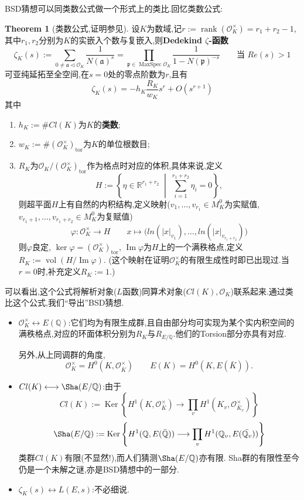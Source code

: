 \documentclass[12pt,A4paper,oneside,reqno]{amsart}
\numberwithin{equation}{section}
\theoremstyle{definition}
\newtheorem{theorem}{Theorem}[section]
\theoremstyle{plain}
\theoremstyle{plain}
\numberwithin{equation}{section}
\theoremstyle{remark}
\DeclareMathOperator{\vol}{vol}
\DeclareMathOperator{\rank}{\operatorname{rank}}
\DeclareMathOperator{\Ker}{\operatorname{Ker}}
\DeclareMathOperator{\Img}{\operatorname{Im}}
\DeclareMathOperator{\tor}{\operatorname{tor}}
\newcommand{\MaxSpec}{\operatorname{MaxSpec}}
\begin{document}
BSD猜想可以同类数公式做一个形式上的类比.回忆类数公式:
\begin{theorem}[类数公式,证明参见{\cite[p217, 定理7.10]{fermat2013dream}}]
	设$K$为数域,记$r:=\rank (\mathcal{O}_K^{\times})=r_1+r_2-1$,其中$r_1,r_2$分别为$K$的实嵌入个数与复嵌入,则\textbf{Dedekind $\zeta$-函数}
	$$\zeta_K(s):=\sum_{0 \neq \mathfrak{a} \vartriangleleft \mathcal{O}_K}\frac{1}{N(\mathfrak{a})^{s}}=\prod_{\mathfrak{p} \in \MaxSpec \mathcal{O}_K} \frac{1}{1-N(\mathfrak{p})^{-s}} \qquad \text{当 }Re(s)>1 $$
	可亚纯延拓至全空间,在$s=0$处的零点阶数为$r$,且有
	$$\zeta_K(s)=-h_K\frac{R_K}{w_K}s^r+O(s^{r+1})$$
	其中
	\begin{enumerate}
		\item $h_K:=\#Cl(K)$为$K$的\textbf{类数};
		\item $w_K:=\#(\mathcal{O}_K^{\times})_{\tor}$为$K$的单位根数目;
		\item $R_K$为$\mathcal{O}_K/(\mathcal{O}_K^{\times})_{\tor}$作为格点时对应的体积,具体来说,定义
		$$H:=\left\{\eta \in \mathbb{R}^{r_1+r_2} \;\middle|\; \sum_{i=1}^{r_1+r_2}\eta_i=0 \right\}, $$
		则超平面$H$上有自然的内积结构,定义映射($v_1,\ldots,v_{r_1} \in M_K^0$为实赋值, $v_{r_1+1},\ldots ,v_{r_1+r_2} \in M_K^0$为复赋值)
		$$\varphi:\mathcal{O}_K^{\times} \longrightarrow H \qquad x \longmapsto \big(ln(|x|_{v_1}), \ldots, ln(|x|_{v_{r_1+r_2}})\big)$$
		则$\varphi$良定, $\ker \varphi =(\mathcal{O}_K^{\times})_{\tor}$, $\Img \varphi$为$H$上的一个满秩格点,定义$R_K:=\vol(H/\Img \varphi)$. (这个映射在证明$\mathcal{O}_K^{\times}$的有限生成性时即已出现过.当$r=0$时,补充定义$R_K:=1$.)
	\end{enumerate}
\end{theorem}
可以看出,这个公式将解析对象($L$函数)同算术对象($Cl(K),\mathcal{O}_K$)联系起来.通过类比这个公式,我们“导出”BSD猜想.
\begin{itemize}
	\item $\mathcal{O}_K^{\times} \longleftrightarrow E(\mathbb{Q})$:它们均为有限生成群,且自由部分均可实现为某个实内积空间的满秩格点,对应的环面体积分别为$R_K$与$R_{E/\mathbb{Q}}$.他们的Torsion部分亦具有对应.
	
	另外,从上同调群的角度,
	$$\mathcal{O}_K^{\times}=H^0(K,\mathcal{O}_{\bar{K}}^{\times}) \qquad E(K)=H^0(K,E(\bar{K})).$$
	\item $Cl(K) \longleftrightarrow \Sha (E/\mathbb{Q})$:由于
	$$Cl(K):=\Ker \left\{H^1(K,\mathcal{O}_{\bar{K}}^{\times}) \longrightarrow \prod_{v}H^1(K_v,\mathcal{O}_{\bar{K}_v}^{\times}) \right\}$$
	$$\Sha(E/\mathbb{Q}):=\Ker \left\{H^1(\mathbb{Q},E(\bar{\mathbb{Q}})) \longrightarrow \prod_{v}H^1(\mathbb{Q}_v,E(\bar{\mathbb{Q}_v})) \right\}$$
	类群$Cl(K)$有限(不显然!),而人们猜测$\Sha (E/\mathbb{Q})$亦有限. Sha群的有限性至今仍是一个未解之谜,亦是BSD猜想中的一部分.
	\item $\zeta_K(s) \longleftrightarrow L(E,s)$:不必细说.
\end{itemize}
\end{document}
